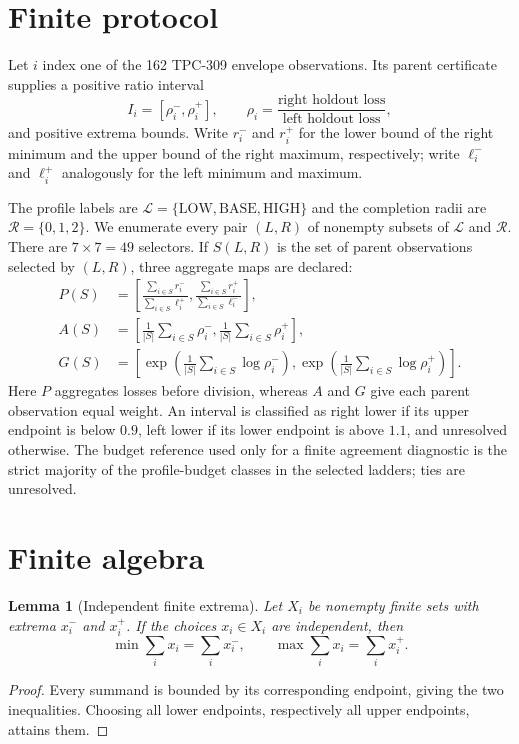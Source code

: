\documentclass[10pt,a4paper]{article}
\newtheorem{lemma}{Lemma}
\begin{document}
\section{Finite protocol}

Let $i$ index one of the 162 TPC-309 envelope observations.  Its parent
certificate supplies a positive ratio interval
\[
 I_i=[\rho_i^-,\rho_i^+],\qquad
 \rho_i=\frac{\text{right holdout loss}}
                 {\text{left holdout loss}},
\]
and positive extrema bounds.  Write $r_i^-$ and $r_i^+$ for the lower bound of
the right minimum and the upper bound of the right maximum, respectively; write
$\ell_i^-$ and $\ell_i^+$ analogously for the left minimum and maximum.

The profile labels are $\mathcal L=\{\mathrm{LOW},\mathrm{BASE},
\mathrm{HIGH}\}$ and the completion radii are $\mathcal R=\{0,1,2\}$.  We
enumerate every pair $(L,R)$ of nonempty subsets of $\mathcal L$ and
$\mathcal R$.  There are $7\times7=49$ selectors.  If $S(L,R)$ is the set of
parent observations selected by $(L,R)$, three aggregate maps are declared:
\begin{align}
 P(S)&=\left[
 \frac{\sum_{i\in S}r_i^-}{\sum_{i\in S}\ell_i^+},
 \frac{\sum_{i\in S}r_i^+}{\sum_{i\in S}\ell_i^-}\right], \label{eq:pooled}\\
 A(S)&=\left[
 \frac1{|S|}\sum_{i\in S}\rho_i^- ,
 \frac1{|S|}\sum_{i\in S}\rho_i^+\right], \label{eq:arith}\\
 G(S)&=\left[
 \exp\!\left(\frac1{|S|}\sum_{i\in S}\log\rho_i^-\right),
 \exp\!\left(\frac1{|S|}\sum_{i\in S}\log\rho_i^+\right)\right]. \label{eq:geom}
\end{align}
Here $P$ aggregates losses before division, whereas $A$ and $G$ give each
parent observation equal weight.  An interval is classified as right lower if
its upper endpoint is below $0.9$, left lower if its lower endpoint is above
$1.1$, and unresolved otherwise.  The budget reference used only for a finite
agreement diagnostic is the strict majority of the profile-budget classes in
the selected ladders; ties are unresolved.

\section{Finite algebra}

\begin{lemma}[Independent finite extrema]
Let $X_i$ be nonempty finite sets with extrema $x_i^-$ and $x_i^+$.  If the
choices $x_i\in X_i$ are independent, then
\[
 \min\sum_i x_i=\sum_i x_i^-,\qquad
 \max\sum_i x_i=\sum_i x_i^+.
\]
\end{lemma}
\begin{proof}
Every summand is bounded by its corresponding endpoint, giving the two
inequalities.  Choosing all lower endpoints, respectively all upper endpoints,
attains them.
\end{proof}
\end{document}
